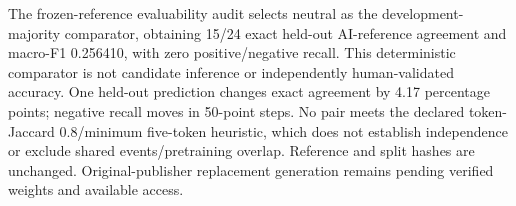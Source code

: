 The frozen-reference evaluability audit selects neutral as the development-majority comparator, obtaining 15/24 exact held-out AI-reference agreement and macro-F1 0.256410, with zero positive/negative recall. This deterministic comparator is not candidate inference or independently human-validated accuracy. One held-out prediction changes exact agreement by 4.17 percentage points; negative recall moves in 50-point steps. No pair meets the declared token-Jaccard 0.8/minimum five-token heuristic, which does not establish independence or exclude shared events/pretraining overlap. Reference and split hashes are unchanged. Original-publisher replacement generation remains pending verified weights and available access.
